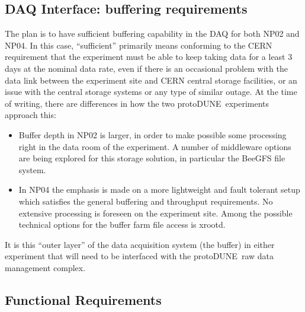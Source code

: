 \documentclass[pdftex,12pt,letter]{article}
\newcommand{\pd}{protoDUNE\ }
\begin{document}
\subsection{DAQ Interface: buffering requirements}
\label{sec:daq_interface}
The plan is to have sufficient buffering capability in the DAQ for both NP02 and NP04. In this case, ``sufficient''
primarily means conforming to the CERN requirement that the experiment must be able to keep taking data for a
least 3 days at the nominal data rate, even if there is an occasional problem with the data link between the
experiment site and CERN central storage facilities, or an issue with the central storage systems or any type of similar outage.
At the time of writing, there are differences in how the two \pd experiments approach this:
\begin{itemize}
\item Buffer depth in NP02 is larger, in order to make possible some processing right in the data room of the experiment. A number of middleware options are being explored for this storage solution, in particular the BeeGFS file system.

\item In NP04 the emphasis is made on a more lightweight and fault tolerant setup which satisfies the general buffering and throughput requirements.
No extensive processing is foreseen on the experiment site. Among the possible technical options for the buffer farm file access is xrootd.
\end{itemize}
It is this ``outer layer'' of the data acquisition system (the buffer) in either experiment that will need to be interfaced with
the \pd raw data management complex.

\subsection{Functional Requirements}
\end{document}
